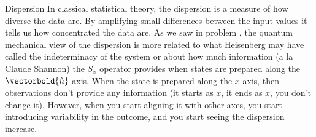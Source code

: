 \begin{answer}
\begin{answerpart}{Dispersion}
    In classical statistical theory, the dispersion is a measure of
    how diverse the data are.  By amplifying small differences between
    the input values it tells us how concentrated the data are.  As we
    saw in problem , the quantum mechanical
    view of the dispersion is more related to what Heisenberg may have
    called the indeterminacy of the system or about how much
    information (a la Claude Shannon) the $S_x$ operator provides when
    states are prepared along the $\vectorbold{\hat{n}}$ axis.  When
    the state is prepared along the $x$ axis, then observations don't
    provide any information (it starts as $x$, it ends as $x$, you
    don't change it).  However, when you start aligning it with other
    axes, you start introducing variability in the outcome, and you
    start seeing the dispersion increase.
  \end{answerpart}

\end{answer}
